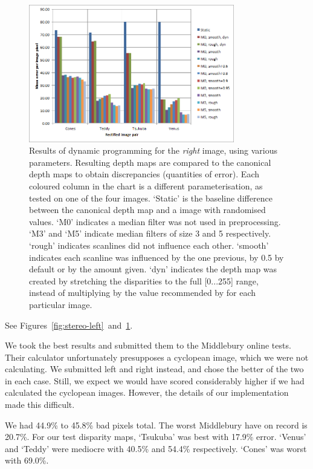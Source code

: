 \begin{figure}[h]
  \centering
  \includegraphics[width=0.8\textwidth]{Stereo-right-report}
  \caption[Results of dynamic programming (left image)]{Results of dynamic programming for the \emph{right} image, using various parameters. Resulting depth maps are compared to the canonical depth maps to obtain discrepancies (quantities of error). Each coloured column in the chart is a different parameterisation, as tested on one of the four images. `Static' is the baseline difference between the canonical depth map and a image with randomised values. `M0' indicates a median filter was not used in preprocessing. `M3' and `M5' indicate median filters of size 3 and 5 respectively. `rough' indicates scanlines did not influence each other. `smooth' indicates each scanline was influenced by the one previous, by 0.5 by default or by the amount given. `dyn' indicates the depth map was created by stretching the disparities to the full [0...255] range, instead of multiplying by the value recommended by \cite{middlebury} for each particular image.}
  \label{fig:stereo-right}
\end{figure}

See Figures~\ref{fig:stereo-left}~and~\ref{fig:stereo-right}.

We took the best results and submitted them to the Middlebury online tests. \cite{stereocorrespondence, middlebury} Their calculator unfortunately presupposes a cyclopean image, which we were not calculating. We submitted left and right instead, and chose the better of the two in each case. Still, we expect we would have scored considerably higher if we had calculated the cyclopean images. However, the details of our implementation made this difficult.

We had 44.9\% to 45.8\% bad pixels total. The worst Middlebury have on record is 20.7\%. \cite{stereocorrespondence, middlebury} For our test disparity maps, `Tsukuba' was best with 17.9\% error. `Venus' and `Teddy' were mediocre with 40.5\% and 54.4\% respectively. `Cones' was worst with 69.0\%.

